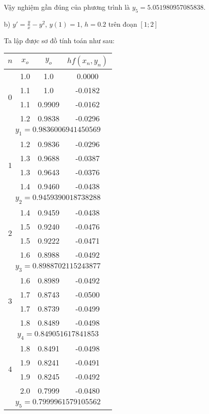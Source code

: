 Vậy nghiệm gần đúng của phương trình là $y_5 = 5.051980957085838$.\par

b) $y'=\frac{y}{x}-y^2$, $y(1)=1$, $h=0.2$ trên đoạn $[1;2]$\par
Ta lập được sơ đồ tính toán như sau:

\begin{longtable}{|c|c|c|c|}\hline
$n$&$x_o$ &$y_o$ &$hf(x_n,y_n)$ \\ \hline
\endhead

\multirow{4}{*}{$0$}
&1.0 &1.0 &0.0000 \\ \cline{2-4}
&1.1 &1.0 &-0.0182 \\ \cline{2-4}
&1.1 &0.9909 &-0.0162 \\ \cline{2-4}
&1.2 &0.9838 &-0.0296 \\ \hline
\multicolumn{4}{|c|}{$y_1 = 0.9836006941450569$} \\ \hline

\multirow{4}{*}{$1$}
&1.2 &0.9836 &-0.0296 \\ \cline{2-4}
&1.3 &0.9688 &-0.0387 \\ \cline{2-4}
&1.3 &0.9643 &-0.0376 \\ \cline{2-4}
&1.4 &0.9460 &-0.0438 \\ \hline
\multicolumn{4}{|c|}{$y_2 = 0.9459390018738288$} \\ \hline

\multirow{4}{*}{$2$}
&1.4 &0.9459 &-0.0438 \\ \cline{2-4}
&1.5 &0.9240 &-0.0476 \\ \cline{2-4}
&1.5 &0.9222 &-0.0471 \\ \cline{2-4}
&1.6 &0.8988 &-0.0492 \\ \hline
\multicolumn{4}{|c|}{$y_3 = 0.8988702115243877$} \\ \hline

\multirow{4}{*}{$3$}
&1.6 &0.8989 &-0.0492 \\ \cline{2-4}
&1.7 &0.8743 &-0.0500 \\ \cline{2-4}
&1.7 &0.8739 &-0.0499 \\ \cline{2-4}
&1.8 &0.8489 &-0.0498 \\ \hline
\multicolumn{4}{|c|}{$y_4 = 0.849051617841853$} \\ \hline

\multirow{4}{*}{$4$}
&1.8 &0.8491 &-0.0498 \\ \cline{2-4}
&1.9 &0.8241 &-0.0491 \\ \cline{2-4}
&1.9 &0.8245 &-0.0492 \\ \cline{2-4}
&2.0 &0.7999 &-0.0480 \\ \hline
\multicolumn{4}{|c|}{$y_5 = 0.7999961579105562$} \\ \hline

\end{longtable}

